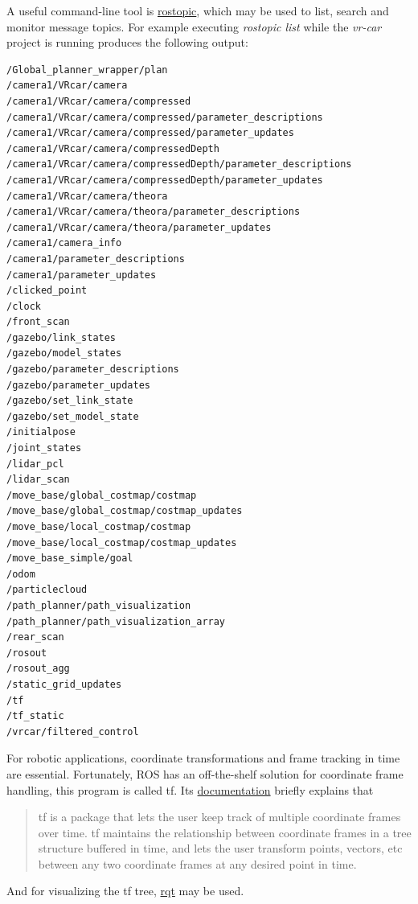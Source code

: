 A useful command-line tool is \href{http://wiki.ros.org/rostopic}{rostopic}, which may be used to list, search and monitor message topics. For example executing \textit{rostopic list} while the \textit{vr-car} project is running produces the following output:

\begin{minipage}{\textwidth}
\begin{lstlisting}[language=bash]
/Global_planner_wrapper/plan
/camera1/VRcar/camera
/camera1/VRcar/camera/compressed
/camera1/VRcar/camera/compressed/parameter_descriptions
/camera1/VRcar/camera/compressed/parameter_updates
/camera1/VRcar/camera/compressedDepth
/camera1/VRcar/camera/compressedDepth/parameter_descriptions
/camera1/VRcar/camera/compressedDepth/parameter_updates
/camera1/VRcar/camera/theora
/camera1/VRcar/camera/theora/parameter_descriptions
/camera1/VRcar/camera/theora/parameter_updates
/camera1/camera_info
/camera1/parameter_descriptions
/camera1/parameter_updates
/clicked_point
/clock
/front_scan
/gazebo/link_states
/gazebo/model_states
/gazebo/parameter_descriptions
/gazebo/parameter_updates
/gazebo/set_link_state
/gazebo/set_model_state
/initialpose
/joint_states
/lidar_pcl
/lidar_scan
/move_base/global_costmap/costmap
/move_base/global_costmap/costmap_updates
/move_base/local_costmap/costmap
/move_base/local_costmap/costmap_updates
/move_base_simple/goal
/odom
/particlecloud
/path_planner/path_visualization
/path_planner/path_visualization_array
/rear_scan
/rosout
/rosout_agg
/static_grid_updates
/tf
/tf_static
/vrcar/filtered_control
\end{lstlisting}
\end{minipage}

For robotic applications, coordinate transformations and frame tracking in time are essential. Fortunately, ROS has an off-the-shelf solution for coordinate frame handling, this program is called tf. Its \href{http://wiki.ros.org/tf}{documentation} briefly explains that

\begin{quote}
	tf is a package that lets the user keep track of multiple coordinate frames over time. tf maintains the relationship between coordinate frames in a tree structure buffered in time, and lets the user transform points, vectors, etc between any two coordinate frames at any desired point in time.
\end{quote}

And for visualizing the tf tree, \href{http://wiki.ros.org/rqt}{rqt} may be used.

